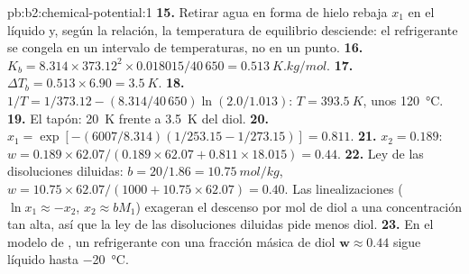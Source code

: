 \begin{solution}{pb:b2:chemical-potential:1}
\textbf{15.} Retirar agua en forma de hielo rebaja $x_1$ en el líquido y, según la
relación, la temperatura de equilibrio desciende: el refrigerante se congela en un intervalo
de temperaturas, no en un punto.
\textbf{16.} $K_b = 8.314 \times 373.12^2 \times 0.018015/40\,650 =
\qty{0.513}{K.kg/mol}$.
\textbf{17.} $\Delta T_b = 0.513 \times 6.90 = \qty{3.5}{K}$.
\textbf{18.} $1/T = 1/373.12 - (8.314/40\,650)\ln(2.0/1.013)$: $T = \qty{393.5}{K}$,
unos \qty{120}{\celsius}.
\textbf{19.} El tapón: \qty{20}{K} frente a \qty{3.5}{K} del diol.
\textbf{20.} $x_1 = \exp[-(6007/8.314)(1/253.15 - 1/273.15)] = 0.811$.
\textbf{21.} $x_2 = 0.189$: $w = 0.189 \times 62.07/(0.189 \times 62.07 + 0.811
\times 18.015) = 0.44$.
\textbf{22.} Ley de las disoluciones diluidas: $b = 20/1.86 = \qty{10.75}{mol/kg}$, $w = 10.75 \times
62.07/(1000 + 10.75 \times 62.07) = 0.40$. Las linealizaciones ($\ln x_1 \approx
-x_2$, $x_2 \approx bM_1$) exageran el descenso por mol de diol a una concentración
tan alta, así que la ley de las disoluciones diluidas pide menos diol.
\textbf{23.} En el modelo de , un refrigerante con una fracción másica de
diol $\boldsymbol{w \approx 0.44}$ sigue líquido hasta \qty{-20}{\celsius}.
\end{solution}
